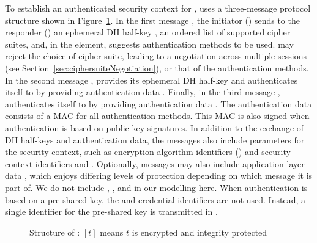 
%
To establish an authenticated security context for \mOscore,
\mEdhoc{} uses a three-message protocol structure
shown in Figure~\ref{fig:edhocFramework}.
%
In the first message \mMsgone{}, the initiator () sends to the responder () an
ephemeral DH half-key \mGx{}, an ordered list of supported cipher suites, and, in the \mMethod{} element, suggests
authentication methods to be used.
%
 may reject the choice of cipher suite, leading to a negotiation across multiple \mEdhoc{} sessions (see Section~\ref{sec:ciphersuiteNegotiation}), or that of the authentication methods.
%
In the second message \mMsgtwo{},  provides its ephemeral
DH half-key \mGy{} and authenticates itself to  by
providing authentication data \mAuthr{}.
%
Finally, in the third message \mMsgthree{},  authenticates itself
to  by providing authentication data \mAuthi{}.
%
The authentication data consists of a MAC for all authentication methods.
%
This MAC is also signed when authentication is based on public key signatures.
%
In addition to the exchange of DH half-keys and authentication data, the
messages also include parameters for the \mOscore{} security context, such as
encryption algorithm identifiers (\mSuites{}) and \mOscore{} security context
identifiers \mCi{} and \mCr{}.
%
Optionally, messages may also include application layer data \mAD{}, which
enjoys differing levels of protection depending on which message it is part of.
%
We do not include \mCi, \mCr, and \mAD{} in our modelling here.
When authentication is based on
a pre-shared key, the \mCredi{} and \mCredr{} credential identifiers are not
used.
%
Instead, a single identifier for the pre-shared key is transmitted in \mMsgone{}.
%
\begin{figure}
\centering
{}
\caption{Structure of \mEdhoc{}: $[t]$ means $t$ is encrypted and integrity protected}
\label{fig:edhocFramework}
\end{figure}


